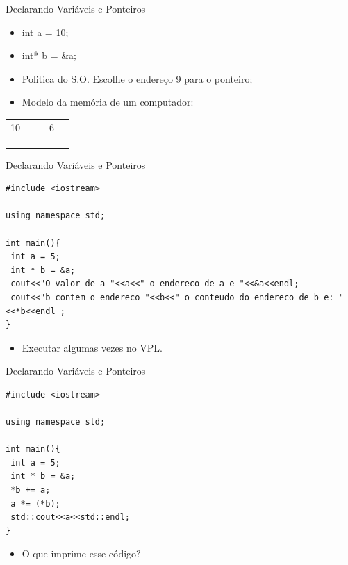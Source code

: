 \documentclass[12pt,table,xcolor={dvipsnames}]{beamer}
\begin{document}
\begin{frame}[fragile]{Declarando Variáveis e Ponteiros}
\begin{itemize}
\item int a = 10;
\item int* b = \&a;
\item Politica do S.O. Escolhe o endereço 9 para o ponteiro;
\item Modelo da memória de um computador:
\end{itemize}
{
\begin{tabular}{ |p{1cm}|p{1cm}|p{1cm}|p{1cm}|p{1cm}| }
\hline
& & & & \\ \hline
10 & & & 6 & \\ \hline
& & & & \\ \hline
& & & & \\ \hline
& & & & \\ \hline
\end{tabular}
}
\end{frame}

\begin{frame}[fragile]{Declarando Variáveis e Ponteiros}
\begin{lstlisting}
#include <iostream>

using namespace std;

int main(){
 int a = 5;
 int * b = &a;
 cout<<"O valor de a "<<a<<" o endereco de a e "<<&a<<endl;
 cout<<"b contem o endereco "<<b<<" o conteudo do endereco de b e: "<<*b<<endl ;
}
\end{lstlisting}
\begin{itemize}
\item Executar algumas vezes no VPL.
\end{itemize}
\end{frame}

\begin{frame}[fragile]{Declarando Variáveis e Ponteiros}
\begin{lstlisting}
#include <iostream>

using namespace std;

int main(){
 int a = 5;
 int * b = &a;
 *b += a;
 a *= (*b);
 std::cout<<a<<std::endl;
}
\end{lstlisting}
\begin{itemize}
\item O que imprime esse código?
\end{itemize}
\end{frame}
\end{document}
